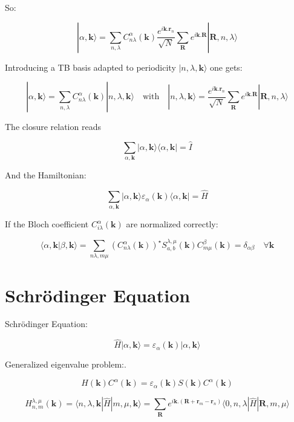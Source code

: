 \documentclass{article}
\newcommand{\bra}[1]{\langle #1|}
\newcommand{\ket}[1]{|#1\rangle}
\newcommand{\braket}[2]{\langle #1|#2\rangle}
\newcommand{\op}[1]{\hat{#1}}
\begin{document}
\noindent
So:

\[\displaystyle \ket{\alpha, \mathbf{k}}=\sum_{n,\lambda} C_{n \lambda}^{\alpha}(\mathbf{k})
\frac{e^{i \mathbf{k}.\mathbf{r}_n}}{\sqrt{N}} \sum_{\mathbf{R}} e^{i \mathbf{k}.\mathbf{R}} \ket{\mathbf{R},n,\lambda } \]

\noindent Introducing a TB basis adapted to periodicity $|n,\lambda, \mathbf{k} \rangle$ one gets:

\[\displaystyle \ket{\alpha, \mathbf{k} }=\sum_{n,\lambda} C_{n \lambda}^{\alpha}(\mathbf{k})\ket{n,\lambda,\mathbf{k}}
\quad \mbox{with} \quad \displaystyle 
\ket{n,\lambda,\mathbf{k}}=\frac{e^{i \mathbf{k}.\mathbf{r}_n}}{\sqrt{N}} \sum_{\mathbf{R}} e^{i \mathbf{k}.\mathbf{R}} \ket{\mathbf{R},n,\lambda }\]

\noindent
The closure relation reads

\[\displaystyle \sum_{\alpha,\mathbf{k}} \ket{\alpha,\mathbf{k}}  \bra{\alpha,\mathbf{k}}=\op{I}\]

\noindent
And the Hamiltonian:

\[ \sum_{\alpha,\mathbf{k}} \ket{\alpha,\mathbf{k}} \varepsilon_{\alpha}(\mathbf{k}) \bra{\alpha,\mathbf{k}}=\op{H}\]


\noindent
If the Bloch coefficient $C_{i \lambda}^{\alpha}(\mathbf{k})$ are normalized correctly:

\[ \braket{\alpha,\mathbf{k}}{\beta,\mathbf{k}}=
\sum_{n \lambda,m \mu} (C_{n \lambda}^{\alpha}(\mathbf{k}))^{\star} S_{a,b}^{\lambda,\mu}(\mathbf{k})C_{m \mu}^{\beta}(\mathbf{k})=\delta_{\alpha \beta}
\quad \forall \mathbf{k} \]


\section{Schr\"odinger Equation}

\noindent
Schr\"odinger Equation:

\[\displaystyle \op{H} \ket{\alpha, \mathbf{k} }=\varepsilon_{\alpha}(\mathbf{k}) \ket{\alpha, \mathbf{k} }\]

\noindent
Generalized eigenvalue problem:.

\[\displaystyle  H(\mathbf{k})C^{\alpha}(\mathbf{k})= \varepsilon_{\alpha}(\mathbf{k})     S(\mathbf{k})C^{\alpha}(\mathbf{k})\]


\noindent
\[\displaystyle H_{n,m}^{\lambda,\mu}(\mathbf{k})=\bra{ n,\lambda,\mathbf{k}} \op{H}\ket{ m,\mu,\mathbf{k}}=
\sum_{\mathbf{R}} e^{i\mathbf{k}.(\mathbf{R}+\mathbf{r}_{m}-\mathbf{r}_n)} \bra{ 0,n,\lambda} \op{H} \ket{\mathbf{R},m,\mu}\]
\end{document}
